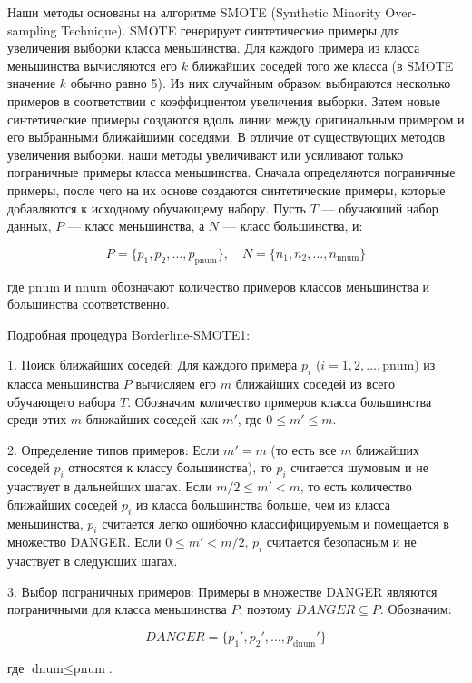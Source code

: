 \documentclass{article}
\begin{document}
Наши методы основаны на алгоритме SMOTE (Synthetic Minority Over-sampling Technique). SMOTE генерирует синтетические примеры для увеличения выборки класса меньшинства. Для каждого примера из класса меньшинства вычисляются его \(k\) ближайших соседей того же класса (в SMOTE значение \(k\) обычно равно 5). Из них случайным образом выбираются несколько примеров в соответствии с коэффициентом увеличения выборки. Затем новые синтетические примеры создаются вдоль линии между оригинальным примером и его выбранными ближайшими соседями. В отличие от существующих методов увеличения выборки, наши методы увеличивают или усиливают только пограничные примеры класса меньшинства. Сначала определяются пограничные примеры, после чего на их основе создаются синтетические примеры, которые добавляются к исходному обучающему набору.
Пусть \( T \) — обучающий набор данных, \( P \) — класс меньшинства, а \( N \) — класс большинства, и:

\[
P = \{p_1, p_2, \dots, p_{\text{pnum}}\}, \quad N = \{n_1, n_2, \dots, n_{\text{nnum}}\}
\]

где \(\text{pnum}\) и \(\text{nnum}\) обозначают количество примеров классов меньшинства и большинства соответственно. 

Подробная процедура Borderline-SMOTE1:

1. Поиск ближайших соседей: Для каждого примера \( p_i \) (\( i = 1, 2, \dots, \text{pnum} \)) из класса меньшинства \( P \) вычисляем его \( m \) ближайших соседей из всего обучающего набора \( T \). Обозначим количество примеров класса большинства среди этих \( m \) ближайших соседей как \( m' \), где \( 0 \leq m' \leq m \).

2. Определение типов примеров: Если \( m' = m \) (то есть все \( m \) ближайших соседей \( p_i \) относятся к классу большинства), то \( p_i \) считается шумовым и не участвует в дальнейших шагах. Если \( m / 2 \leq m' < m \), то есть количество ближайших соседей \( p_i \) из класса большинства больше, чем из класса меньшинства, \( p_i \) считается легко ошибочно классифицируемым и помещается в множество DANGER. Если \( 0 \leq m' < m / 2 \), \( p_i \) считается безопасным и не участвует в следующих шагах.

3. Выбор пограничных примеров: Примеры в множестве DANGER являются пограничными для класса меньшинства \( P \), поэтому \( DANGER \subseteq P \). Обозначим:

\[
DANGER = \{p_1', p_2', \dots, p_{\text{dnum}}'\}
\]

где \(\text{dnum} \leq \text{pnum}\).
\end{document}
